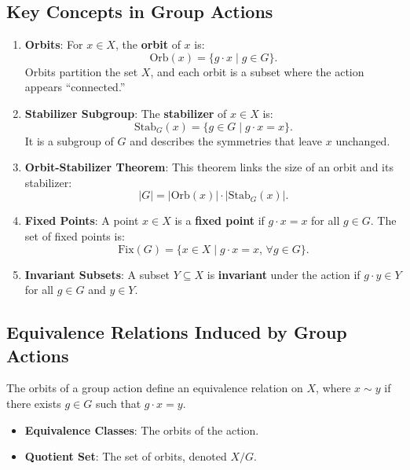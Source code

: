 \documentclass[11pt]{article}
\theoremstyle{definition}
\begin{document}
\subsection*{Key Concepts in Group Actions}

\begin{enumerate}
    \item \textbf{Orbits}:
    For \( x \in X \), the \textbf{orbit} of \( x \) is:
    \[
    \text{Orb}(x) = \{g \cdot x \mid g \in G\}.
    \]
    Orbits partition the set \( X \), and each orbit is a subset where the action appears ``connected.''

    \item \textbf{Stabilizer Subgroup}:
    The \textbf{stabilizer} of \( x \in X \) is:
    \[
    \text{Stab}_G(x) = \{g \in G \mid g \cdot x = x\}.
    \]
    It is a subgroup of \( G \) and describes the symmetries that leave \( x \) unchanged.

    \item \textbf{Orbit-Stabilizer Theorem}:
    This theorem links the size of an orbit and its stabilizer:
    \[
    |G| = |\text{Orb}(x)| \cdot |\text{Stab}_G(x)|.
    \]

    \item \textbf{Fixed Points}:
    A point \( x \in X \) is a \textbf{fixed point} if \( g \cdot x = x \) for all \( g \in G \). The set of fixed points is:
    \[
    \text{Fix}(G) = \{x \in X \mid g \cdot x = x, \, \forall g \in G\}.
    \]

    \item \textbf{Invariant Subsets}:
    A subset \( Y \subseteq X \) is \textbf{invariant} under the action if \( g \cdot y \in Y \) for all \( g \in G \) and \( y \in Y \).
\end{enumerate}

\subsection*{Equivalence Relations Induced by Group Actions}

The orbits of a group action define an equivalence relation on \( X \), where \( x \sim y \) if there exists \( g \in G \) such that \( g \cdot x = y \).

\begin{itemize}
    \item \textbf{Equivalence Classes}: The orbits of the action.
    \item \textbf{Quotient Set}: The set of orbits, denoted \( X/G \).
\end{itemize}
\end{document}
